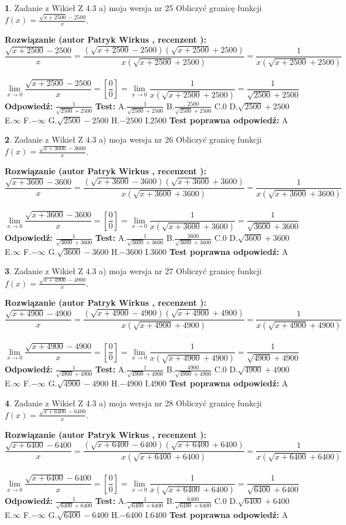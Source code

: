 \documentclass[12pt, a4paper]{article}
\theoremstyle{definition} %
\newtheorem{zad}{}
\newcommand{\zadStart}[1]{\begin{zad}#1\newline}
\newcommand{\zadStop}{\end{zad}}
\newcommand{\rozwStart}[2]{\noindent \textbf{Rozwiązanie (autor #1 , recenzent #2): }\newline}
\newcommand{\rozwStop}{\newline}
\newcommand{\odpStart}{\noindent \textbf{Odpowiedź:}\newline}
\newcommand{\odpStop}{\newline}
\newcommand{\testStart}{\noindent \textbf{Test:}\newline}
\newcommand{\testStop}{\newline}
\newcommand{\kluczStart}{\noindent \textbf{Test poprawna odpowiedź:}\newline}
\newcommand{\kluczStop}{\newline}
\begin{document}
\zadStart{Zadanie z Wikieł Z 4.3 a) moja wersja nr 25}
Obliczyć granicę funkcji $f(x)=\frac{\sqrt{x+2500}-2500}{x}$.
\zadStop
\rozwStart{Patryk Wirkus}{}
$$\frac{\sqrt{x+2500}-2500}{x}=\frac{(\sqrt{x+2500}-2500)(\sqrt{x+2500}+2500)}{x(\sqrt{x+2500}+2500)}=\frac{1}{x(\sqrt{x+2500}+2500)}$$
\\
$$\lim\limits_{x\to0}\frac{\sqrt{x+2500}-2500}{x}=[\frac{0}{0}]=
\lim\limits_{x\to0}\frac{1}{x(\sqrt{x+2500}+2500)} = \frac{1}{\sqrt{2500}+2500}$$
\rozwStop
\odpStart
$\frac{1}{\sqrt{2500}+2500}$
\odpStop
\testStart
A.$\frac{1}{\sqrt{2500}+2500}$
B.$\frac{2500}{\sqrt{2500}+2500}$
C.$0$
D.$\sqrt{2500}+2500$
E.$\infty$
F.$-\infty$
G.$\sqrt{2500}-2500$
H.$-2500$
I.$2500$
\testStop
\kluczStart
A
\kluczStop



\zadStart{Zadanie z Wikieł Z 4.3 a) moja wersja nr 26}
Obliczyć granicę funkcji $f(x)=\frac{\sqrt{x+3600}-3600}{x}$.
\zadStop
\rozwStart{Patryk Wirkus}{}
$$\frac{\sqrt{x+3600}-3600}{x}=\frac{(\sqrt{x+3600}-3600)(\sqrt{x+3600}+3600)}{x(\sqrt{x+3600}+3600)}=\frac{1}{x(\sqrt{x+3600}+3600)}$$
\\
$$\lim\limits_{x\to0}\frac{\sqrt{x+3600}-3600}{x}=[\frac{0}{0}]=
\lim\limits_{x\to0}\frac{1}{x(\sqrt{x+3600}+3600)} = \frac{1}{\sqrt{3600}+3600}$$
\rozwStop
\odpStart
$\frac{1}{\sqrt{3600}+3600}$
\odpStop
\testStart
A.$\frac{1}{\sqrt{3600}+3600}$
B.$\frac{3600}{\sqrt{3600}+3600}$
C.$0$
D.$\sqrt{3600}+3600$
E.$\infty$
F.$-\infty$
G.$\sqrt{3600}-3600$
H.$-3600$
I.$3600$
\testStop
\kluczStart
A
\kluczStop



\zadStart{Zadanie z Wikieł Z 4.3 a) moja wersja nr 27}
Obliczyć granicę funkcji $f(x)=\frac{\sqrt{x+4900}-4900}{x}$.
\zadStop
\rozwStart{Patryk Wirkus}{}
$$\frac{\sqrt{x+4900}-4900}{x}=\frac{(\sqrt{x+4900}-4900)(\sqrt{x+4900}+4900)}{x(\sqrt{x+4900}+4900)}=\frac{1}{x(\sqrt{x+4900}+4900)}$$
\\
$$\lim\limits_{x\to0}\frac{\sqrt{x+4900}-4900}{x}=[\frac{0}{0}]=
\lim\limits_{x\to0}\frac{1}{x(\sqrt{x+4900}+4900)} = \frac{1}{\sqrt{4900}+4900}$$
\rozwStop
\odpStart
$\frac{1}{\sqrt{4900}+4900}$
\odpStop
\testStart
A.$\frac{1}{\sqrt{4900}+4900}$
B.$\frac{4900}{\sqrt{4900}+4900}$
C.$0$
D.$\sqrt{4900}+4900$
E.$\infty$
F.$-\infty$
G.$\sqrt{4900}-4900$
H.$-4900$
I.$4900$
\testStop
\kluczStart
A
\kluczStop



\zadStart{Zadanie z Wikieł Z 4.3 a) moja wersja nr 28}
Obliczyć granicę funkcji $f(x)=\frac{\sqrt{x+6400}-6400}{x}$.
\zadStop
\rozwStart{Patryk Wirkus}{}
$$\frac{\sqrt{x+6400}-6400}{x}=\frac{(\sqrt{x+6400}-6400)(\sqrt{x+6400}+6400)}{x(\sqrt{x+6400}+6400)}=\frac{1}{x(\sqrt{x+6400}+6400)}$$
\\
$$\lim\limits_{x\to0}\frac{\sqrt{x+6400}-6400}{x}=[\frac{0}{0}]=
\lim\limits_{x\to0}\frac{1}{x(\sqrt{x+6400}+6400)} = \frac{1}{\sqrt{6400}+6400}$$
\rozwStop
\odpStart
$\frac{1}{\sqrt{6400}+6400}$
\odpStop
\testStart
A.$\frac{1}{\sqrt{6400}+6400}$
B.$\frac{6400}{\sqrt{6400}+6400}$
C.$0$
D.$\sqrt{6400}+6400$
E.$\infty$
F.$-\infty$
G.$\sqrt{6400}-6400$
H.$-6400$
I.$6400$
\testStop
\kluczStart
A
\kluczStop
\end{document}
